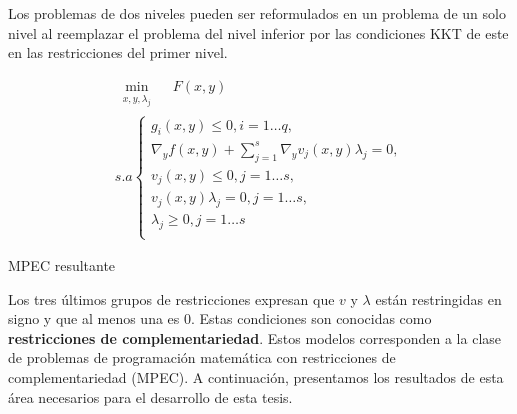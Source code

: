 		
		Los problemas de dos niveles pueden ser reformulados en un problema de un solo nivel al reemplazar el problema del nivel inferior por las condiciones KKT de este en las restricciones del primer nivel. 
		
        
       \begin{table}[H]
        \centering
        \begin{equation}
            \begin{array}{l}
                \underset{\substack{x, y, \lambda_j}}{\min} \quad F(x, y)\\
                s.a \left\{ 
                \begin{array}{l}
                    g_i(x, y) \leq 0, i=1\ldots q,\\
                    \nabla_{y} f(x, y) + \sum_{j=1}^{s} \nabla_{y} v_j(x, y) \lambda_j = 0, \\
                    v_j(x, y) \leq 0, j=1\ldots s,\\
                    v_j(x, y)\lambda_j = 0, j=1\ldots s, \\
                    \lambda_j \geq 0, j=1\ldots s\\
                \end{array}\right.
                \tag{\theequation}
            \end{array}
            \label{eq:KKT_Optimista}
        \end{equation}
        \caption*{MPEC resultante}

    \end{table}
    
Los tres últimos grupos de restricciones expresan que $v$ y $\lambda$ están restringidas en signo y que al menos una es 0. Estas condiciones son conocidas como \textbf{restricciones de complementariedad}. Estos modelos corresponden a la clase de problemas de programación matemática con restricciones de complementariedad (MPEC). A continuación, presentamos los resultados de esta área necesarios para el desarrollo de esta tesis.

